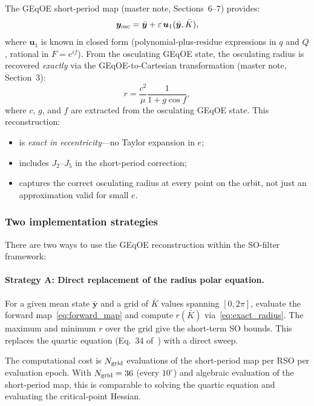 \documentclass[11pt]{article}
\newcommand{\eps}{\varepsilon}
\begin{document}
The GEqOE short-period map (master note, Sections~6--7) provides:
\begin{equation}
\bm y_{\rm osc} = \bar{\bm y} + \eps\,\bm u_1(\bar{\bm y}, \bar K),
\label{eq:forward_map}
\end{equation}
where $\bm u_1$ is known in closed form (polynomial-plus-residue expressions
in $q$ and $Q$, rational in $F = e^{if}$). From the osculating GEqOE state,
the osculating radius is recovered \emph{exactly} via the GEqOE-to-Cartesian
transformation (master note, Section~3):
\begin{equation}
r = \frac{c^2}{\mu}\frac{1}{1 + g\cos f},
\label{eq:exact_radius}
\end{equation}
where $c$, $g$, and $f$ are extracted from the osculating GEqOE state.
This reconstruction:
\begin{itemize}
\item is \emph{exact in eccentricity}---no Taylor expansion in $e$;
\item includes $J_2$--$J_5$ in the short-period correction;
\item captures the correct osculating radius at every point on the orbit, not
just an approximation valid for small $e$.
\end{itemize}

\subsubsection{Two implementation strategies}

There are two ways to use the GEqOE reconstruction within the SO-filter
framework:

\paragraph{Strategy A: Direct replacement of the radius polar equation.}
For a given mean state $\bar{\bm y}$ and a grid of $\bar K$ values spanning
$[0, 2\pi]$, evaluate the forward map~\eqref{eq:forward_map} and compute
$r(\bar K)$ via~\eqref{eq:exact_radius}. The maximum and minimum $r$ over
the grid give the short-term SO bounds. This replaces the quartic equation
(Eq.~34 of~\cite{rivero2025}) with a direct sweep.

The computational cost is $N_{\rm grid}$ evaluations of the short-period map
per RSO per evaluation epoch. With $N_{\rm grid} = 36$ (every $10^\circ$) and
algebraic evaluation of the short-period map, this is comparable to solving
the quartic equation and evaluating the critical-point Hessian.
\end{document}
